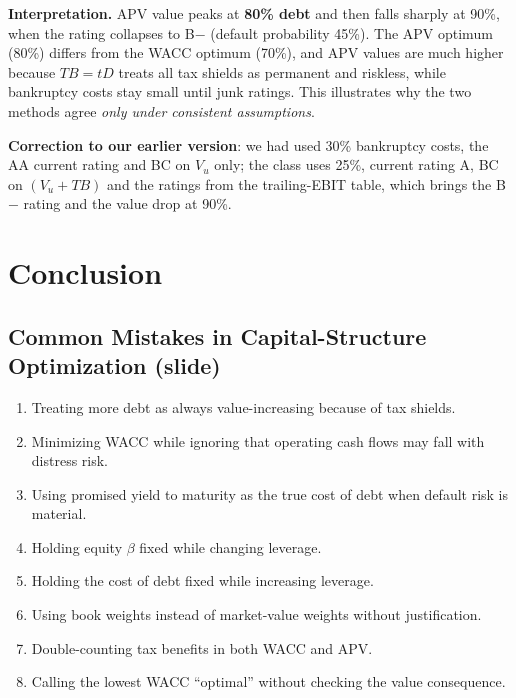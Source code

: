 \begin{exbox}
\textbf{Interpretation.} APV value peaks at \textbf{80\% debt} and then falls sharply at 90\%, when the rating collapses to B$-$ (default probability 45\%). The APV optimum (80\%) differs from the WACC optimum (70\%), and APV values are much higher because $TB=tD$ treats all tax shields as permanent and riskless, while bankruptcy costs stay small until junk ratings. This illustrates why the two methods agree \emph{only under consistent assumptions}.

\footnotesize \textbf{Correction to our earlier version}: we had used 30\% bankruptcy costs, the AA current rating and BC on $V_u$ only; the class uses 25\%, current rating A, BC on $(V_u+TB)$ and the ratings from the trailing-EBIT table, which brings the B$-$ rating and the value drop at 90\%.
\end{exbox}

\section{Conclusion}

\subsection{Common Mistakes in Capital-Structure Optimization (slide)}
\begin{enumerate}
  \item Treating more debt as always value-increasing because of tax shields.
  \item Minimizing WACC while ignoring that operating cash flows may fall with distress risk.
  \item Using promised yield to maturity as the true cost of debt when default risk is material.
  \item Holding equity $\beta$ fixed while changing leverage.
  \item Holding the cost of debt fixed while increasing leverage.
  \item Using book weights instead of market-value weights without justification.
  \item Double-counting tax benefits in both WACC and APV.
  \item Calling the lowest WACC ``optimal'' without checking the value consequence.
\end{enumerate}

